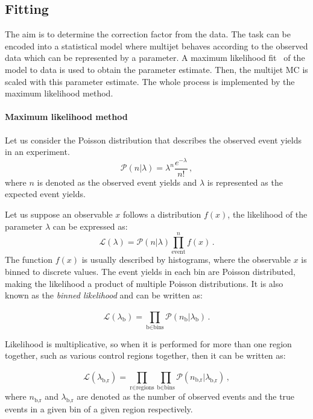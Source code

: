 \subsection{Fitting}
\label{sec:abcd:furtherimprovement:fitting}
The aim is to determine the correction factor from the data. The task can be encoded into a statistical model where multijet behaves according to the observed data which can be represented by a parameter. A maximum likelihood fit~\cite{likelihood} of the model to data is used to obtain the parameter estimate. Then, the multijet MC is scaled with this parameter estimate. The whole process is implemented by the maximum likelihood method.

\paragraph{Maximum likelihood method} 
Let us consider the Poisson distribution that describes the observed event yields in an experiment.~\cite{thesis:rui} 
\begin{equation}
	\mathcal{P}(n|\lambda) = \lambda^{n} \frac{e^{-\lambda}}{n!} \,,
\end{equation}
where $n$ is denoted as the observed event yields and $\lambda$ is represented as the expected event yields.

Let us suppose an observable $x$ follows a distribution $f(x)$, the likelihood of the parameter $\lambda$ can be expressed as:
\begin{equation}
\mathcal{L}(\lambda) = \mathcal{P}(n|\lambda) \prod_{\text{event}}^{n} f(x) \,.
\end{equation}
The function $f(x)$ is usually described by histograms, where the observable $x$ is binned to discrete values. The event yields in each bin are Poisson distributed, making the likelihood a product of multiple Poisson distributions. It is also known as the \textit{binned likelihood} and can be written as:

\begin{equation}
\mathcal{L}(\lambda_{\text{b}}) = \prod_{\text{b$\in$bins}}^{} \mathcal{P}(n_{\text{b}}|\lambda_{\text{b}}) \,.
\end{equation}

Likelihood is multiplicative, so when it is performed for more than one region together, such as various control regions together, then it can be written as:

\begin{equation}
\mathcal{L}(\lambda_{\text{b,r}}) = \prod_{\text{r$\in$regions}}^{}\prod_{\text{b$\in$bins}}^{} \mathcal{P}(n_{\text{b,r}}|\lambda_{\text{b,r}}) \,,
\end{equation}
where $n_{\text{b,r}}$ and $\lambda_{\text{b,r}}$ are denoted as the number of observed events and the true events in a given bin of a given region respectively.

